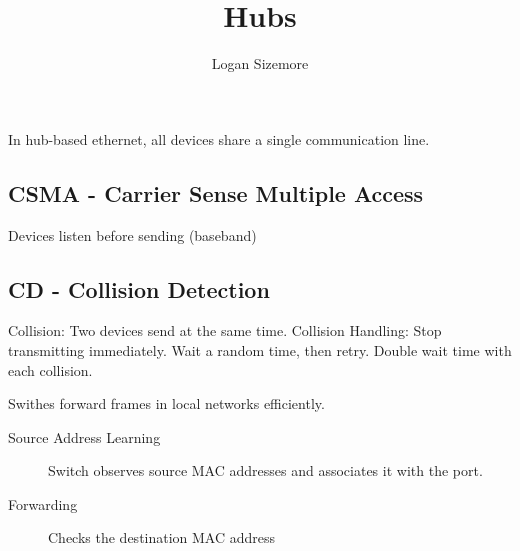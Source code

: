 \documentclass{article}
\title{Hubs}
\author{Logan Sizemore}
\begin{document}
\maketitle

In hub-based ethernet, all devices share a single communication line.

\subsection*{CSMA - Carrier Sense Multiple Access}
Devices listen before sending (baseband)

\subsection*{CD - Collision Detection}
Collision: Two devices send at the same time.
Collision Handling:
Stop transmitting immediately.
Wait a random time, then retry.
Double wait time with each collision.

Swithes forward frames in local networks efficiently.

\begin{description}
    \item[Source Address Learning] Switch observes source MAC addresses and
          associates it with the port.
    \item[Forwarding] Checks the destination MAC address
\end{description}
\end{document}
